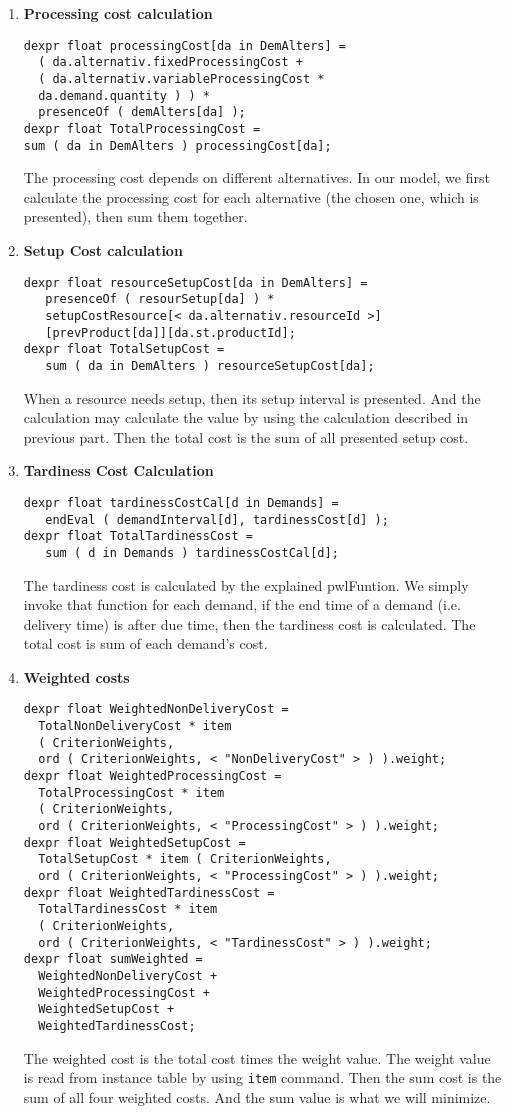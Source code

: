 \documentclass[a4paper, 12pt]{article}
\begin{document}
\begin{enumerate}
\item \textbf{Processing cost calculation}
\begin{lstlisting}
dexpr float processingCost[da in DemAlters] = 
  ( da.alternativ.fixedProcessingCost + 
  ( da.alternativ.variableProcessingCost * 
  da.demand.quantity ) ) * 
  presenceOf ( demAlters[da] );
dexpr float TotalProcessingCost = 
sum ( da in DemAlters ) processingCost[da];
\end{lstlisting}
The processing cost depends on different alternatives. In our model, we first calculate the processing cost for each alternative (the chosen one, which is presented), then sum them together.
\item \textbf{Setup Cost calculation}
\begin{lstlisting}
dexpr float resourceSetupCost[da in DemAlters] = 
   presenceOf ( resourSetup[da] ) * 
   setupCostResource[< da.alternativ.resourceId >]
   [prevProduct[da]][da.st.productId];
dexpr float TotalSetupCost = 
   sum ( da in DemAlters ) resourceSetupCost[da];
\end{lstlisting} 
When a resource needs setup, then its setup interval is presented. And the calculation may calculate the value by using the calculation described in previous part. Then the total cost is the sum of all presented setup cost. 
\item \textbf{Tardiness Cost Calculation}
\begin{lstlisting}
dexpr float tardinessCostCal[d in Demands] = 
   endEval ( demandInterval[d], tardinessCost[d] );
dexpr float TotalTardinessCost = 
   sum ( d in Demands ) tardinessCostCal[d];
\end{lstlisting}
The tardiness cost is calculated by the explained pwlFuntion. We simply invoke that function for each demand, if the end time of a demand (i.e. delivery time) is after due time, then the tardiness cost is calculated. The total cost is sum of each demand's cost. 
\item \textbf{Weighted costs}
\begin{lstlisting}
dexpr float WeightedNonDeliveryCost = 
  TotalNonDeliveryCost * item 
  ( CriterionWeights, 
  ord ( CriterionWeights, < "NonDeliveryCost" > ) ).weight;
dexpr float WeightedProcessingCost = 
  TotalProcessingCost * item 
  ( CriterionWeights, 
  ord ( CriterionWeights, < "ProcessingCost" > ) ).weight;
dexpr float WeightedSetupCost = 
  TotalSetupCost * item ( CriterionWeights, 
  ord ( CriterionWeights, < "ProcessingCost" > ) ).weight;
dexpr float WeightedTardinessCost = 
  TotalTardinessCost * item 
  ( CriterionWeights, 
  ord ( CriterionWeights, < "TardinessCost" > ) ).weight;
dexpr float sumWeighted = 
  WeightedNonDeliveryCost + 
  WeightedProcessingCost + 
  WeightedSetupCost + 
  WeightedTardinessCost;
\end{lstlisting}
The weighted cost is the total cost times the weight value. The weight value is read from instance table by using \texttt{item} command. Then the sum cost is the sum of all four weighted costs. And the sum value is what we will minimize. 
\end{enumerate}
\end{document}
